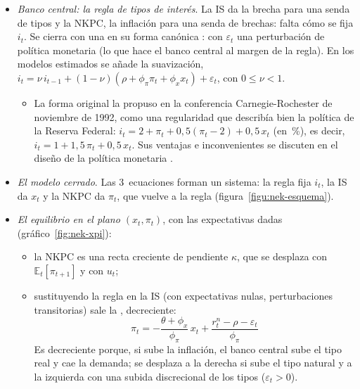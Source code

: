 \documentclass[11pt]{article}
\begin{document}
\begin{itemize}
\begin{itemize}
  \end{itemize}
\item \emph{Banco central: la regla de tipos de interés}. La IS da la brecha para una senda de tipos y la NKPC, la inflación para una senda de brechas: falta cómo se fija $i_t$. Se cierra con una  en su forma canónica :
  con $\varepsilon_t$ una perturbación de política monetaria (lo que hace el banco central al margen de la regla). En los modelos estimados se añade la suavización, $i_t=\nu\,i_{t-1}+(1-\nu)(\rho+\phi_\pi\pi_t+\phi_x x_t)+\varepsilon_t$, con $0\leq\nu<1$.
  \begin{itemize}
  \item La forma original la propuso \textcite{Taylor1993} en la conferencia Carnegie-Rochester de noviembre de 1992, como una regularidad que describía bien la política de la Reserva Federal: $i_t=2+\pi_t+0{,}5(\pi_t-2)+0{,}5\,x_t$ (en~\%), es decir, $i_t=1+1{,}5\,\pi_t+0{,}5\,x_t$. Sus ventajas e inconvenientes se discuten en el diseño de la política monetaria .
  \end{itemize}
\item \emph{El modelo cerrado}. Las 3~ecuaciones forman un sistema: la regla fija $i_t$, la IS da $x_t$ y la NKPC da $\pi_t$, que vuelve a la regla (figura~\ref{figu:nek-esquema}).
\end{itemize}

\begin{infografia}[H]
\centering
\caption{El modelo canónico: 3~ecuaciones que se cierran entre sí}\label{figu:nek-esquema}
\end{infografia}

\begin{itemize}
\item \emph{El equilibrio en el plano $(x_t,\pi_t)$}, con las expectativas dadas (gráfico~\ref{fig:nek-xpi}):
  \begin{itemize}
  \item la NKPC es una recta creciente de pendiente $\kappa$, que se desplaza con $\mathbb{E}_t[\pi_{t+1}]$ y con $u_t$;
  \item sustituyendo la regla en la IS (con expectativas nulas, perturbaciones transitorias) sale la , decreciente:
    \begin{equation}
    \pi_t=-\frac{\theta+\phi_x}{\phi_\pi}\,x_t+\frac{r^n_t-\rho-\varepsilon_t}{\phi_\pi} \label{eq:da-dinamica}
    \end{equation}
    Es decreciente porque, si sube la inflación, el banco central sube el tipo real y cae la demanda; se desplaza a la derecha si sube el tipo natural y a la izquierda con una subida discrecional de los tipos ($\varepsilon_t>0$).
  \end{itemize}
\end{itemize}
\end{document}
